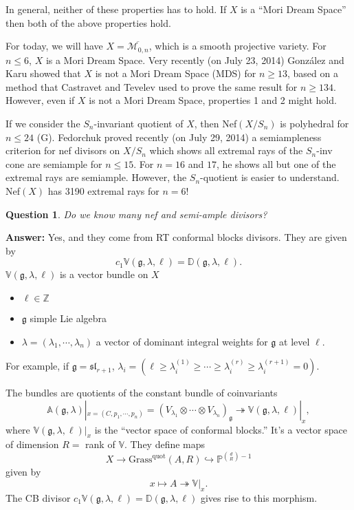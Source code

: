\documentclass[12pt]{article}
\newcommand{\PP}{\mathbb{P}}
\newcommand{\ZZ}{\mathbb{Z}}
\newcommand{\MM}{\mathcal{M}}
\newcommand{\VV}{\mathbb{V}}
\newcommand{\DD}{\mathbb{D}}
\newtheorem{question}[theorem]{Question}
\begin{document}
In general, neither of these properties has to hold.  If $X$ is a ``Mori Dream Space'' then both of the above properties hold.

For today, we will have $X = \overline{\MM_{0,n}}$, which is a smooth projective variety.  For $n \leq 6$, $X$ is a Mori Dream Space.  Very recently (on July 23, 2014) Gonz\'{a}lez and Karu showed that $X$ is not a Mori Dream Space (MDS) for $n \geq 13$, based on a method that Castravet and Tevelev used to prove the same result for $n \geq 134$.  However, even if $X$ is not a Mori Dream Space, properties 1 and 2 might hold.

If we consider the $S_n$-invariant quotient of $X$, then Nef$(X/S_n)$ is polyhedral for $n \leq 24$ (G).  Fedorchuk proved recently (on July 29, 2014) a semiampleness criterion for nef divisors on $X/S_n$ which shows all extremal rays of the $S_n$-inv cone are semiample for $n \leq 15$.  For $n = 16$ and $17$, he shows all but one of the extremal rays are semiample.  However, the $S_n$-quotient is easier to understand.  Nef$(X)$ has 3190 extremal rays for $n=6$!

\begin{question}
Do we know many nef and semi-ample divisors?
\end{question}
\textbf{Answer:} Yes, and they come from RT conformal blocks divisors.  They are given by
\[ c_1 \mathbb{V}(\mathfrak{g},\lambda,\ell) = \mathbb{D}(\mathfrak{g},\lambda,\ell) .\]
$\mathbb{V}(\mathfrak{g},\lambda,\ell)$ is a vector bundle on $X$
\begin{itemize}
\item $\ell \in \ZZ$
\item $\mathfrak{g}$ simple Lie algebra
\item $\lambda = (\lambda_1, \cdots, \lambda_n)$ a vector of dominant integral weights for $\mathfrak{g}$ at level $\ell$.
\end{itemize}
For example, if $\mathfrak{g} = \mathfrak{sl}_{r+1}$, $\lambda_i = (\ell \geq \lambda_i^{(1)} \geq \cdots \geq \lambda_i^{(r)} \geq \lambda_i^{(r+1)} = 0)$.

The bundles are quotients of the constant bundle of coinvariants
\[ \mathbb{A}(\mathfrak{g},\lambda)|_{x = (C,p_1,\cdots,p_n)} = (V_{\lambda_1} \otimes \cdots \otimes V_{\lambda_n})_{\mathfrak{g}} \twoheadrightarrow \mathbb{V}(\mathfrak{g},\lambda,\ell)|_{x} ,\]
where $\mathbb{V}(\mathfrak{g},\lambda,\ell)|_{x}$ is the ``vector space of conformal blocks.''  It's a vector space of dimension $R = $ rank of $\mathbb{V}$.  They define maps
\[ X \to \text{Grass}^{\text{quot}}(A,R) \hookrightarrow \PP^{\binom{d}{R}-1} \]
given by
\[ x \mapsto A \twoheadrightarrow \mathbb{V}|_x .\]
The CB divisor $c_1 \VV(\mathfrak{g},\lambda,\ell) = \DD(\mathfrak{g}, \lambda, \ell)$ gives rise to this morphism.
\end{document}
